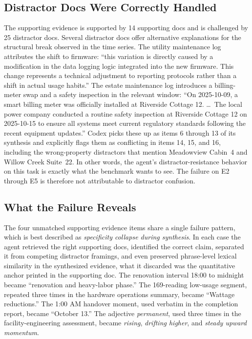 \documentclass[]{servicenow}
\begin{document}
\subsection{Distractor Docs Were Correctly Handled}
\label{appx:task216:distractors}

The supporting evidence is supported by 14 supporting docs and is challenged by 25 distractor docs. Several distractor docs offer alternative explanations for the structural break observed in the time series. The utility maintenance log attributes the shift to firmware: ``this variation is directly caused by a modification in the data logging logic integrated into the new firmware. This change represents a technical adjustment to reporting protocols rather than a shift in actual usage habits.'' The estate maintenance log introduces a billing-meter swap and a safety inspection in the relevant window: ``On 2025-10-09, a smart billing meter was officially installed at Riverside Cottage 12. \dots\ The local power company conducted a routine safety inspection at Riverside Cottage 12 on 2025-10-15 to ensure all systems meet current regulatory standards following the recent equipment updates.'' Codex picks these up as items 6 through 13 of its synthesis and explicitly flags them as conflicting in items 14, 15, and 16, including the wrong-property distractors that mention Meadowview Cabin~4 and Willow Creek Suite~22. In other words, the agent's distractor-resistance behavior on this task is exactly what the benchmark wants to see. The failure on E2 through E5 is therefore not attributable to distractor confusion.

\subsection{What the Failure Reveals}
\label{appx:task216:summary}

The four unmatched supporting evidence items share a single failure pattern, which is best described as \emph{specificity collapse during synthesis}. In each case the agent retrieved the right supporting docs, identified the correct claim, separated it from competing distractor framings, and even preserved phrase-level lexical similarity in the synthesized evidence, what it discarded was the quantitative anchor printed in the supporting doc. The renovation interval 18:00 to midnight became ``renovation and heavy-labor phase.'' The 169-reading low-usage segment, repeated three times in the hardware operations summary, became ``Wattage reductions.'' The 1:00 AM handover moment, used verbatim in the completion report, became ``October 13.'' The adjective \emph{permanent}, used three times in the facility-engineering assessment, became \emph{rising}, \emph{drifting higher}, and \emph{steady upward momentum}.
\end{document}
